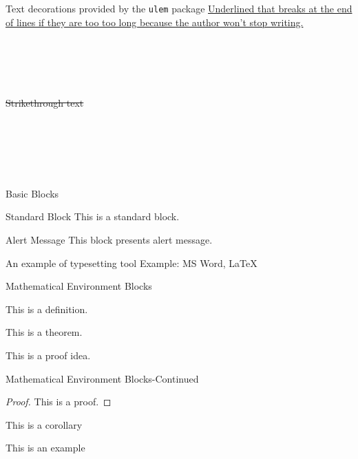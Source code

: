\documentclass{beamer}
\begin{document}
\begin{frame}{Text decorations provided by the \texttt{ulem} package}
\uline{Underlined that breaks at the end of lines if they are too too long because the author won’t stop writing.} \\~\\
 \\~\\
 \\~\\
\sout{Strikethrough text} \\~\\
 \\~\\
 \\~\\
\end{frame}

\begin{frame}{Basic Blocks}
	\begin{block}{Standard Block}
		This is a standard block.
	\end{block}
	\begin{alertblock}{Alert Message}
		This block presents alert message.
	\end{alertblock}
	\begin{exampleblock}{An example of typesetting tool}
		Example: MS Word, \LaTeX{}
	\end{exampleblock}
\end{frame}
\begin{frame}{Mathematical Environment Blocks}
	\begin{definition}
		This is a definition.
	\end{definition}

	\begin{theorem}
		This is a theorem.
	\end{theorem}

	\begin{lemma}
		This is a proof idea.
	\end{lemma}
\end{frame}
\begin{frame}{Mathematical Environment Blocks-Continued}
	\begin{proof}
		This is a proof.
	\end{proof}

	\begin{corollary}
		This is a corollary
	\end{corollary}

	\begin{example}
		This is an example
	\end{example}
\end{frame}
\end{document}
